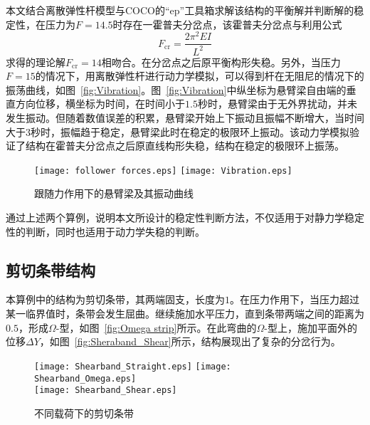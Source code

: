 本文结合离散弹性杆模型与COCO的“ep”工具箱求解该结构的平衡解并判断解的稳定性，在压力为$F=14.5$时存在一霍普夫分岔点，该霍普夫分岔点与利用公式\cite{elishakoff2001non}
\begin{equation}
	F_{\mathrm{cr}}=\frac{2\pi^2EI}{L^2}
\end{equation}
求得的理论解$F_{\mathrm{cr}}=14$相吻合。在分岔点之后原平衡构形失稳。另外，当压力$F=15$的情况下，用离散弹性杆进行动力学模拟，可以得到杆在无阻尼的情况下的振荡曲线，如图~\ref{fig:Vibration}。图~\ref{fig:Vibration}中纵坐标为悬臂梁自由端的垂直方向位移，横坐标为时间，在时间小于$1.5$秒时，悬臂梁由于无外界扰动，并未发生振动。但随着数值误差的积累，悬臂梁开始上下振动且振幅不断增大，当时间大于$3$秒时，振幅趋于稳定，悬臂梁此时在稳定的极限环上振动。该动力学模拟验证了结构在霍普夫分岔点之后原直线构形失稳，结构在稳定的极限环上振荡。
\begin{figure}
	\centering
	{\texttt{[image: follower forces.eps]}}
	{\texttt{[image: Vibration.eps]}}\\
	\caption{跟随力作用下的悬臂梁及其振动曲线}
	\label{fig:跟随力作用下的悬臂梁的失稳行为}
\end{figure}

通过上述两个算例，说明本文所设计的稳定性判断方法，不仅适用于对静力学稳定性的判断，同时也适用于动力学失稳的判断。
\subsection{剪切条带结构}
本算例中的结构为剪切条带\cite{yu2019bifurcations}，其两端固支，长度为$1$。在压力作用下，当压力超过某一临界值时，条带会发生屈曲。继续施加水平压力，直到条带两端之间的距离为$0.5$，形成$\Omega$-型，如图~\ref{fig:Omega strip}所示。在此弯曲的$\Omega$-型上，施加平面外的位移$\Delta Y$，如图~\ref{fig:Sheraband_Shear}所示，结构展现出了复杂的分岔行为。
\begin{figure}
	\centering
	{\texttt{[image: Shearband\_Straight.eps]}}
	{\texttt{[image: Shearband\_Omega.eps]}}\\
	{\texttt{[image: Shearband\_Shear.eps]}}
	\caption{不同载荷下的剪切条带}
	\label{fig:不同载荷下的剪切条带}
\end{figure}

